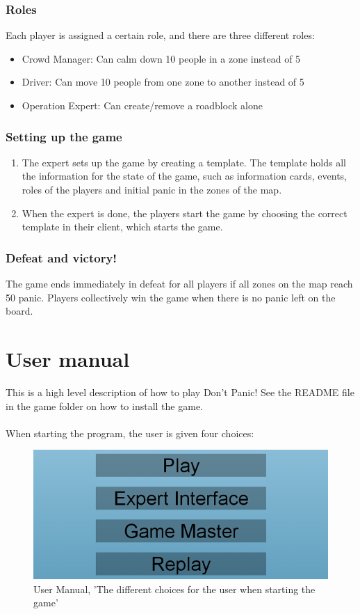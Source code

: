 \subsection*{Roles}
Each player is assigned a certain role, and there are three different roles:
\begin{itemize}
	\item Crowd Manager: Can calm down 10 people in a zone instead of 5
	\item Driver: Can move 10 people from one zone to another instead of 5
	\item Operation Expert: Can create/remove a roadblock alone
\end{itemize}
%
\subsection*{Setting up the game}
\begin{enumerate}
	\item The expert sets up the game by creating a template. The template holds all the information for the state of the game, such as information cards, events, roles of the players and initial panic in the zones of the map.
	\item When the expert is done, the players start the game by choosing the correct template in their client, which starts the game.
\end{enumerate}
%
\subsection*{Defeat and victory!}
The game ends immediately in defeat for all players if all zones on the map reach 50 panic. Players collectively win the game when there is no panic left on the board.


\chapter{User manual}
\label{appendix:D}
%
This is a high level description of how to play Don't Panic! See the README file in the game folder on how to install the game.\\
\\
When starting the program, the user is given four choices:

\begin{figure}[H]
  \centering
    \includegraphics[width=1.0\textwidth]{img/choices.png}
  \caption{User Manual, 'The different choices for the user when starting the game'}
  \label{fig:choices}
\end{figure}

